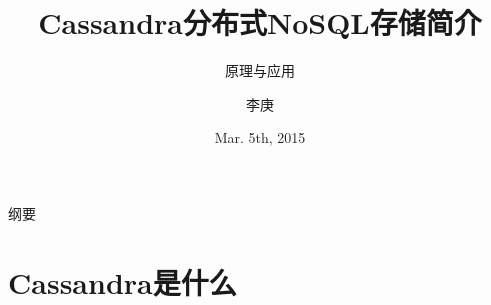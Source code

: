 \documentclass{beamer}
\begin{document}
\begin{CJK}{UTF8}{gbsn}

\title{Cassandra分布式NoSQL存储简介}

\subtitle{原理与应用}

\author{李庚}


\date{Mar. 5th, 2015}

\subject{2015度假部门技术分享}





\begin{frame}
  \titlepage
\end{frame}

\begin{frame}{纲要}
  \tableofcontents
\end{frame}

\section{Cassandra是什么}


\end{CJK}
\end{document}

